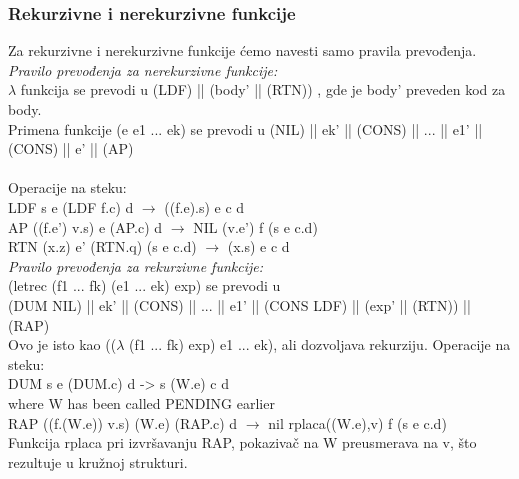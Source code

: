 \subsubsection{Rekurzivne i nerekurzivne funkcije}

Za rekurzivne i nerekurzivne funkcije ćemo navesti samo pravila prevođenja.\\

{\em Pravilo prevođenja za nerekurzivne funkcije:}\\
$\lambda$ funkcija se prevodi u (LDF) || (body' || (RTN)) , gde je body' preveden kod za body.\\
Primena funkcije (e e1 ... ek) se prevodi u (NIL) || ek' || (CONS) || ... || e1' || (CONS) || e' || (AP)\\\\
Operacije na steku:\\
LDF s e (LDF f.c) d $\rightarrow$ ((f.e).s) e c d\\
AP ((f.e') v.s) e (AP.c) d $\rightarrow$ NIL (v.e') f (s e c.d)\\
RTN (x.z) e' (RTN.q) (s e c.d) $\rightarrow$ (x.s) e c d\\

{\em Pravilo prevođenja za rekurzivne funkcije:}\\
(letrec (f1 ... fk) (e1 ... ek) exp) se prevodi u\\
(DUM NIL) || ek' || (CONS) || ... || e1' || (CONS LDF) || (exp' || (RTN)) || (RAP)\\
Ovo je isto kao (($\lambda$ (f1 ... fk) exp) e1 ... ek), ali dozvoljava rekurziju.
Operacije na steku:\\
DUM s e (DUM.c) d -> s (W.e) c d\\
where W has been called PENDING earlier\\
RAP ((f.(W.e)) v.s) (W.e) (RAP.c) d $\rightarrow$ nil rplaca((W.e),v) f (s e c.d)\\
Funkcija rplaca pri izvršavanju RAP, pokazivač na W preusmerava na v, što rezultuje u kružnoj strukturi.


